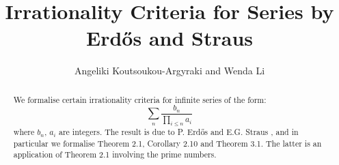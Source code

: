 \documentclass[11pt,a4paper]{article}
\begin{document}
\title{Irrationality Criteria for Series by Erd\H{o}s and Straus}
\author{Angeliki Koutsoukou-Argyraki and Wenda Li}
\maketitle

\begin{abstract}
We formalise certain irrationality criteria for infinite series of the form:
\[
\sum_n\frac{b_n}{\prod_{i \leq n} a_i} 
\]
where $b_n$, $a_i$ are integers. The result is due to P. Erd\H{o}s and E.G. Straus \cite{erdHos1974irrationality}, and in particular we formalise Theorem 2.1, Corollary 2.10 and Theorem 3.1. The latter is an application of Theorem 2.1 involving the prime numbers.
\end{abstract}


\tableofcontents



\nocite{apostol1976analytic}


\end{document}
